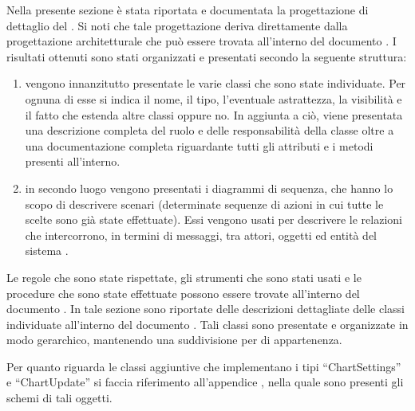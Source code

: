	Nella presente sezione è stata riportata e documentata la progettazione di dettaglio del  . Si noti che tale progettazione deriva direttamente dalla progettazione architetturale che può essere trovata all'interno del documento . I risultati ottenuti sono stati organizzati e presentati secondo la seguente struttura:
	\begin{enumerate}
		\item vengono innanzitutto presentate le varie classi che sono state individuate. Per ognuna di esse si indica il nome, il tipo, l'eventuale astrattezza, la visibilità e il fatto che estenda altre classi oppure no. In aggiunta a ciò, viene presentata una descrizione completa del ruolo e delle responsabilità della classe oltre a una documentazione completa riguardante tutti gli attributi e i metodi presenti all'interno.
		\item in secondo luogo vengono presentati i diagrammi di sequenza, che hanno lo scopo di descrivere scenari (determinate sequenze di azioni in cui tutte le scelte sono già state effettuate). Essi vengono usati per descrivere le relazioni che intercorrono, in termini di messaggi, tra attori, oggetti ed entità del sistema .
	\end{enumerate}
	Le regole che sono state rispettate, gli strumenti che sono stati usati e le procedure che sono state effettuate possono essere trovate all'interno del documento .
    	In tale sezione sono riportate delle descrizioni dettagliate delle classi individuate all'interno del documento . Tali classi sono presentate e organizzate in modo gerarchico, mantenendo una suddivisione per  di appartenenza.
        

        Per quanto riguarda le classi aggiuntive che implementano i tipi “ChartSettings” e “ChartUpdate” si faccia riferimento all'appendice , nella quale sono presenti gli schemi  di tali oggetti.
        

